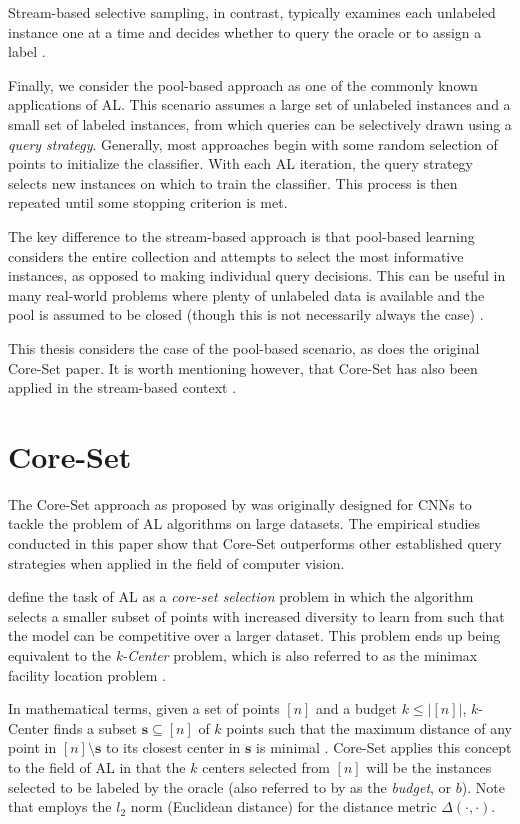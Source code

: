 \documentclass[english,bachelor,ul]{webisthesis} %
\begin{document}
Stream-based selective sampling, in contrast, typically examines each unlabeled instance one at a time and decides whether to query the oracle or to assign a label \citep{settles.tr09}.

Finally, we consider the pool-based approach as one of the commonly known applications of AL. This scenario assumes a large set of unlabeled instances and a small set of labeled instances, from which queries can be selectively drawn using a \textit{query strategy}. Generally, most approaches begin with some random selection of points to initialize the classifier. With each AL iteration, the query strategy selects new instances on which to train the classifier. This process is then repeated until some stopping criterion is met. 

The key difference to the stream-based approach is that pool-based learning considers the entire collection and attempts to select the most informative instances, as opposed to making individual query decisions. This can be useful in many real-world problems where plenty of unlabeled data is available and the pool is assumed to be closed (though this is not necessarily always the case) \citep{settles.tr09}.

This thesis considers the case of the pool-based scenario, as does the original Core-Set paper. It is worth mentioning however, that Core-Set has also been applied in the stream-based context \citep{DBLP:conf/icml/SaranYK0A23}.

\section{Core-Set}

The Core-Set approach as proposed by \cite{DBLP:conf/iclr/SenerS18} was originally designed for CNNs to tackle the problem of AL algorithms on large datasets. The empirical studies conducted in this paper show that Core-Set outperforms other established query strategies when applied in the field of computer vision.

\cite{DBLP:conf/iclr/SenerS18} define the task of AL as a \textit{core-set selection} problem in which the algorithm selects a smaller subset of points with increased diversity to learn from such that the model can be competitive over a larger dataset. This problem ends up being equivalent to the \textit{k-Center} problem, which is also referred to as the minimax facility location problem \citep{DBLP:conf/iclr/SenerS18}. 

In mathematical terms, given a set of points $ [n] $ and a budget $ k \leq |[n]| $, $k$-Center finds a subset $ \mathbf{s} \subseteq [n] $ of $ k $ points such that the maximum distance of any point in $ [n] \setminus \mathbf{s} $ to its closest center in $ \mathbf{s} $ is minimal \citep{har2008geometric}. Core-Set applies this concept to the field of AL in that the $ k $ centers selected from $ [n] $ will be the instances selected to be labeled by the oracle (also referred to by \cite{DBLP:conf/iclr/SenerS18} as the \textit{budget}, or $ b $). Note that \cite{DBLP:conf/iclr/SenerS18} employs the $ l_2 $ norm (Euclidean distance) for the distance metric $ \Delta(\cdot, \cdot) $. 
\end{document}
